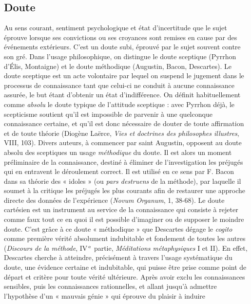\subsection{Doute}
%

Au sens courant, sentiment psychologique
et état d’incertitude que le sujet
éprouve lorsque ses convictions ou ses
croyances sont remises en cause par des
événements extérieurs. C’est un doute
subi, éprouvé par le sujet souvent contre
%
son gré. Dans l’usage philosophique, on
distingue le doute sceptique (Pyrrhon
d'Élis, Montaigne) et le doute méthodique
(Augustin, Bacon, Descartes). Le
doute sceptique est un acte volontaire par
lequel on suspend le jugement dans le
processus de connaissance tant que celui-ci
ne conduit à aucune connaissance assurée,
le but étant d'obtenir un état d’indifférence.
On définit habituellement
comme {\it absolu} le doute typique de l’attitude
sceptique : avec Pyrrhon déjà, le
scepticisme soutient qu’il est impossible
de parvenir à une quelconque connaissance
certaine, et qu’il est donc nécessaire
de douter de toute affirmation et de toute
théorie (Diogène Laërce, {\it Vies et doctrines
des philosophes illustres}, VIII, 103).
Divers auteurs, à commencer par saint
Augustin, opposent au doute absolu des
sceptiques un usage {\it méthodique} du doute.
Il est alors un moment préliminaire de la
connaissance, destiné à éliminer de l’investigation
les préjugés qui en entravent
le déroulement correct. Il est utilisé en ce
sens par F. Bacon dans sa théorie des
« idoles » (ou {\it pars destruens} de la
méthode), par laquelle il soumet à la critique
les préjugés les plus courants afin de
restaurer une approche directe des données
de l’expérience ({\it Novum Organum}, 1,
38-68). Le doute cartésien est un instrument
au service de la connaissance qui
consiste à rejeter comme faux tout ce en
quoi il est possible d’imaginer ou de supposer
le moindre doute. C’est grâce à ce
doute « méthodique » que Descartes
dégage le {\it cogito} comme première vérité
absolument indubitable et fondement de
toutes les autres ({\it Discours de la méthode},
IV$^\text{\,e}$ partie, {\it Méditations métaphysiques} I et
II). En effet, Descartes cherche à
atteindre, précisément à travers l’usage
systématique du doute, une évidence certaine
et indubitable, qui puisse être prise
comme point de départ et critère pour
toute vérité ultérieure. Après avoir exclu
les connaissances sensibles, puis les
connaissances rationnelles, et allant jusqu’à
admettre l’hypothèse d’un « mauvais
génie » qui éprouve du plaisir à induire
